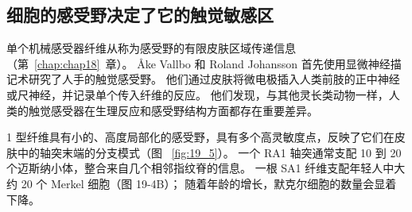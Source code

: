 \subsection{细胞的感受野决定了它的触觉敏感区}

单个机械感受器纤维从称为感受野的有限皮肤区域传递信息（第~\ref{chap:chap18}~章）。
Åke Vallbo 和 Roland Johansson 首先使用显微神经描记术研究了人手的触觉感受野。
他们通过皮肤将微电极插入人类前肢的正中神经或尺神经，并记录单个传入纤维的反应。
他们发现，与其他灵长类动物一样，人类的触觉感受器在生理反应和感受野结构方面都存在重要差异。


1 型纤维具有小的、高度局部化的感受野，具有多个高灵敏度点，反映了它们在皮肤中的轴突末端的分支模式（图 ~\ref{fig:19_5}）。
一个 RA1 轴突通常支配 10 到 20 个迈斯纳小体，整合来自几个相邻指纹脊的信息。
一根 SA1 纤维支配年轻人中大约 20 个 Merkel 细胞（图 19-4B）；
随着年龄的增长，默克尔细胞的数量会显着下降。


